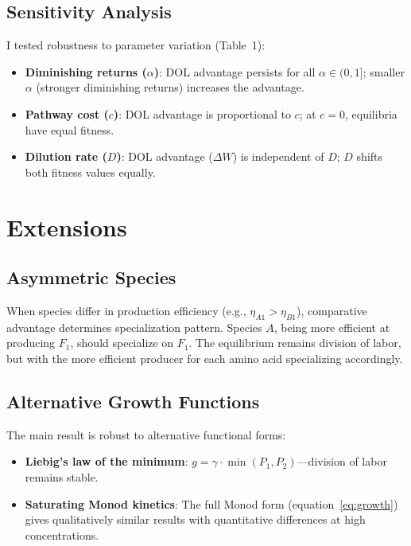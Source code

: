 \documentclass[11pt]{article}
\theoremstyle{definition}
\begin{document}
\subsection{Sensitivity Analysis}

I tested robustness to parameter variation (Table~1):
\begin{itemize}
\item \textbf{Diminishing returns ($\alpha$)}: DOL advantage persists for all $\alpha \in (0,1]$; smaller $\alpha$ (stronger diminishing returns) increases the advantage.
\item \textbf{Pathway cost ($c$)}: DOL advantage is proportional to $c$; at $c = 0$, equilibria have equal fitness.
\item \textbf{Dilution rate ($D$)}: DOL advantage ($\Delta W$) is independent of $D$; $D$ shifts both fitness values equally.
\end{itemize}

\section{Extensions}

\subsection{Asymmetric Species}

When species differ in production efficiency (e.g., $\eta_{A1} > \eta_{B1}$), comparative advantage determines specialization pattern. Species $A$, being more efficient at producing $F_1$, should specialize on $F_1$. The equilibrium remains division of labor, but with the more efficient producer for each amino acid specializing accordingly.

\subsection{Alternative Growth Functions}

The main result is robust to alternative functional forms:
\begin{itemize}
\item \textbf{Liebig's law of the minimum}: $g = \gamma \cdot \min(P_1, P_2)$---division of labor remains stable.
\item \textbf{Saturating Monod kinetics}: The full Monod form (equation~\ref{eq:growth}) gives qualitatively similar results with quantitative differences at high concentrations.
\end{itemize}
\end{document}
